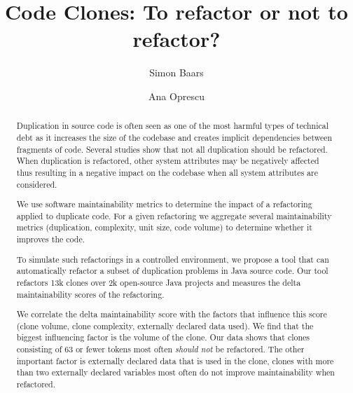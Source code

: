 \documentclass[sigconf,review,anonymous]{acmart}
\begin{document}
\title{Code Clones: To refactor or not to refactor?}

\author{Simon Baars}

\author{Ana Oprescu}

\begin{abstract}
Duplication in source code is often seen as one of the most harmful types of technical debt as it increases the size of the codebase and creates implicit dependencies between fragments of code. Several studies show that not all duplication should be refactored. When duplication is refactored, other system attributes may be negatively affected thus resulting in a negative impact on the codebase when all system attributes are considered.

We use software maintainability metrics to determine the impact of a refactoring applied to duplicate code. For a given refactoring we aggregate several maintainability metrics (duplication, complexity, unit size, code volume) to determine whether it improves the code.

To simulate such refactorings in a controlled environment, we propose a tool that can automatically refactor a subset of duplication problems in Java source code. Our tool refactors 13k clones over 2k open-source Java projects and measures the delta maintainability scores of the refactoring.

We correlate the delta maintainability score with the factors that influence this score (clone volume, clone complexity, externally declared data used). We find that the biggest influencing factor is the volume of the clone. Our data shows that clones consisting of 63 or fewer tokens most often \textit{should not} be refactored. The other important factor is externally declared data that is used in the clone, clones with more than two externally declared variables most often do not improve maintainability when refactored.

\end{abstract}
\end{document}
